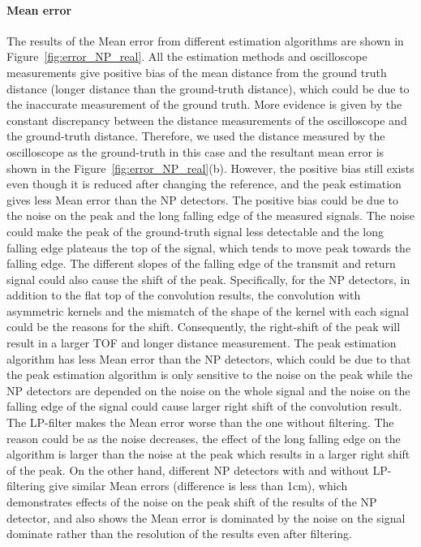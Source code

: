 \paragraph{Mean error}
The results of the Mean error from different estimation algorithms are shown in Figure~\ref{fig:error_NP_real}. All the estimation methods and oscilloscope measurements give positive bias of the mean distance from the ground truth distance (\ie longer distance than the ground-truth distance), which could be due to the inaccurate measurement of the ground truth. More evidence is given by the constant discrepancy between the distance measurements of the oscilloscope and the ground-truth distance. Therefore, we used the distance measured by the oscilloscope as the ground-truth in this case and the resultant mean error is shown in the Figure~\ref{fig:error_NP_real}(b). However, the positive bias still exists even though it is reduced after changing the reference, and the peak estimation gives less Mean error than the NP detectors. The positive bias could be due to the noise on the peak and the long falling edge of the measured signals. The noise could make the peak of the ground-truth signal less detectable and the long falling edge plateaus the top of the signal, which tends to move peak towards the falling edge. The different slopes of the falling edge of the transmit and return signal could also cause the shift of the peak. Specifically, for the NP detectors, in addition to the flat top of the convolution results, the convolution with asymmetric kernels and the mismatch of the shape of the kernel with each signal could be the reasons for the shift. Consequently, the right-shift of the peak will result in a larger TOF and longer distance measurement. The peak estimation algorithm has less Mean error than the NP detectors, which could be due to that the peak estimation algorithm is only sensitive to the noise on the peak while the NP detectors are depended on the noise on the whole signal and the noise on the falling edge of the signal could cause larger right shift of the convolution result. The LP-filter makes the Mean error worse than the one without filtering. The reason could be as the noise decreases, the effect of the long falling edge on the algorithm is larger than the noise at the peak which results in a larger right shift of the peak. On the other hand, different NP detectors with and without LP-filtering give similar Mean errors (difference is less than 1cm), which demonstrates effects of the noise on the peak shift of the results of the NP detector, and also shows the Mean error is dominated by the noise on the signal dominate rather than the resolution of the results even after filtering.
